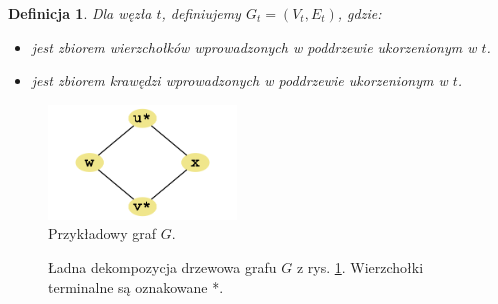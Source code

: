 \documentclass[12pt, oneside]{report}
\newtheorem{definition}{Definicja}
\begin{document}
\begin{definition}
\em Dla węzła $t$, definiujemy $G_t = (V_t, E_t)$, gdzie: 
\begin{itemize}[noitemsep,topsep=5pt,parsep=0pt,partopsep=0pt]
\item[$V_t$]{jest zbiorem wierzchołków wprowadzonych w poddrzewie ukorzenionym w $t$.}
\item[$E_t$]{jest zbiorem krawędzi wprowadzonych w poddrzewie ukorzenionym w $t$.} 
\end{itemize}
\end{definition}

\begin{figure}
\centering
\includegraphics[width=5cm]{square_steiner_tree_standard_graph.png}
\caption{Przykładowy graf $G$.}
\label{kwadrat}
\end{figure}

\begin{figure}
\centering
{}
\caption{Ładna dekompozycja drzewowa grafu $G$ z rys. \ref{kwadrat}. Wierzchołki terminalne są oznakowane *.}
\label{dekompozycja_kwadratu}
\end{figure}
\end{document}
